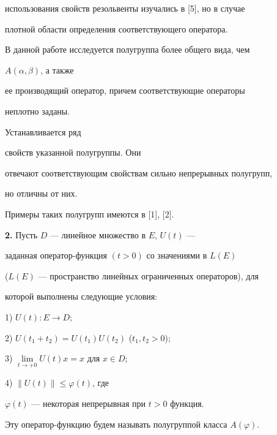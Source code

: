 использования свойств резольвенты изучались в [5], но в случае


плотной области определения соответствующего оператора.





В данной работе исследуется полугруппа более общего вида, чем


$A(\alpha,\beta)$, а также


ее производящий оператор, причем соответствующие операторы


неплотно заданы.


Устанавливается ряд


свойств указанной полугруппы. Они


отвечают соответствующим свойствам сильно непрерывных полугрупп,


но отличны от них.





Примеры таких полугрупп имеются в [1], [2].


\medskip





{\bf 2.} Пусть $D$ --- линейное множество в $E$, $U(t)$ ---


заданная оператор-функция $(t>0)$ со значениями в $L(E)$


($L(E)$ --- пространство линейных ограниченных операторов), для


которой выполнены следующие условия:





1) $U(t):E\to D$;





2) $U(t_{1}+t_{2})=U(t_{1})U(t_{2})$ ($t_{1},t_{2}>0$);





3) $\lim\limits_{t\to +0}U(t)x=x$ для $x\in D$;





4) $\| U(t)\|\leq \varphi(t)$, где


$\varphi(t)$ --- некоторая непрерывная при $t>0$ функция.





Эту оператор-функцию будем называть полугруппой класса $A(\varphi)$.





